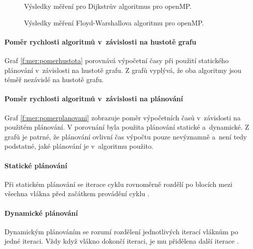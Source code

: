 \begin{figure}
    \centering
    \caption{Výsledky měření pro Dijkstrův algoritmus pro openMP.}
    \label{f:omp:vysledky:dijkstra}
\end{figure}

\begin{figure}
    \centering
    \caption{Výsledky měření Floyd-Warshallova algoritmu pro openMP.}
    \label{f:omp:vysledky:fw}
\end{figure}

\paragraph{Poměr rychlosti algoritmů v~závislosti na hustotě grafu}
Graf \ref{f:mer:pomerhustota} porovnává výpočetní časy při použití statického plánování v~závislosti na hustotě grafu. Z grafů vyplývá, že oba algoritmy jsou téměř nezávislé na hustotě grafu.

\paragraph{Poměr rychlosti algoritmů v~závislosti na plánování}
Graf \ref{f:mer:pomerplanovani} zobrazuje poměr výpočetních časů v~závislosti na použitém plánování. V porovnání byla použita plánování statické a~dynamické. Z grafů je patrné, že plánování ovlivní čas výpočtu pouze nevýznamně a~není tedy podstatné, jaké plánování je v~algoritmu použito.
\paragraph{Statické plánování}
Při statickém plánování se iterace cyklu rovnoměrně rozdělí po blocích mezi všechna vlákna před začátkem provádění cyklu \cite{w:omp}.
\paragraph{Dynamické plánování}
Dynamickým plánováním se rozumí rozdělení jednotlivých iterací vláknům po jedné iteraci. Vždy když vlákno dokončí iteraci, je mu přidělena další iterace \cite{w:omp}.

